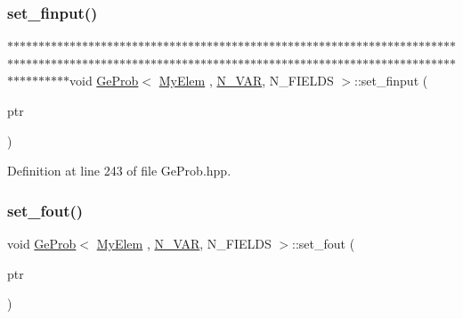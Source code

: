 \subsubsection{\texorpdfstring{set\+\_\+finput()}{set\_finput()}}
{\footnotesize\ttfamily $\ast$$\ast$$\ast$$\ast$$\ast$$\ast$$\ast$$\ast$$\ast$$\ast$$\ast$$\ast$$\ast$$\ast$$\ast$$\ast$$\ast$$\ast$$\ast$$\ast$$\ast$$\ast$$\ast$$\ast$$\ast$$\ast$$\ast$$\ast$$\ast$$\ast$$\ast$$\ast$$\ast$$\ast$$\ast$$\ast$$\ast$$\ast$$\ast$$\ast$$\ast$$\ast$$\ast$$\ast$$\ast$$\ast$$\ast$$\ast$$\ast$$\ast$$\ast$$\ast$$\ast$$\ast$$\ast$$\ast$$\ast$$\ast$$\ast$$\ast$$\ast$$\ast$$\ast$$\ast$$\ast$$\ast$$\ast$$\ast$$\ast$$\ast$$\ast$$\ast$$\ast$$\ast$$\ast$$\ast$$\ast$$\ast$$\ast$$\ast$$\ast$$\ast$$\ast$$\ast$$\ast$$\ast$$\ast$$\ast$$\ast$$\ast$$\ast$$\ast$$\ast$$\ast$$\ast$$\ast$$\ast$$\ast$$\ast$$\ast$$\ast$$\ast$$\ast$$\ast$$\ast$$\ast$$\ast$$\ast$$\ast$$\ast$$\ast$$\ast$$\ast$$\ast$$\ast$$\ast$$\ast$$\ast$$\ast$$\ast$$\ast$$\ast$$\ast$$\ast$$\ast$$\ast$$\ast$$\ast$$\ast$$\ast$$\ast$$\ast$$\ast$$\ast$$\ast$$\ast$$\ast$$\ast$$\ast$$\ast$$\ast$$\ast$$\ast$$\ast$$\ast$$\ast$$\ast$$\ast$$\ast$$\ast$$\ast$$\ast$$\ast$$\ast$void \hyperlink{classGeProb}{Ge\+Prob}$<$ \hyperlink{DG__Prob_8h_a83cd887ced9a6587428f267e50cd4787}{My\+Elem} , \hyperlink{classED__Prob_a4e7d2ff1a8e435e336fb00c527224b5a}{N\+\_\+\+V\+AR}, N\+\_\+\+F\+I\+E\+L\+DS $>$\+::set\+\_\+finput (\begin{DoxyParamCaption}\item[{F\+I\+LE $\ast$}]{ptr }\end{DoxyParamCaption})\hspace{0.3cm}{\ttfamily [inherited]}}



Definition at line 243 of file Ge\+Prob.\+hpp.

\mbox{\label{classGeProb_adba307125006b1f5e0bd9a04e05cecf2}} 
\subsubsection{\texorpdfstring{set\+\_\+fout()}{set\_fout()}}
{\footnotesize\ttfamily void \hyperlink{classGeProb}{Ge\+Prob}$<$ \hyperlink{DG__Prob_8h_a83cd887ced9a6587428f267e50cd4787}{My\+Elem} , \hyperlink{classED__Prob_a4e7d2ff1a8e435e336fb00c527224b5a}{N\+\_\+\+V\+AR}, N\+\_\+\+F\+I\+E\+L\+DS $>$\+::set\+\_\+fout (\begin{DoxyParamCaption}\item[{F\+I\+LE $\ast$}]{ptr }\end{DoxyParamCaption})\hspace{0.3cm}{\ttfamily [inherited]}}



